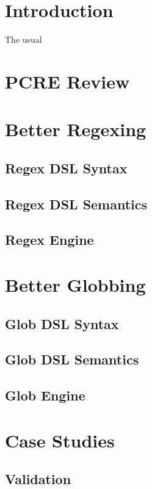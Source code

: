 \documentclass[acmsmall,review,anonymous]{acmart}
\begin{document}
\cite{bosque}

\section{Introduction}
The usual

\section{PCRE Review}

\section{Better Regexing}

\subsection{Regex DSL Syntax}

\subsection{Regex DSL Semantics}

\subsection{Regex Engine}

\section{Better Globbing}

\subsection{Glob DSL Syntax}

\subsection{Glob DSL Semantics}

\subsection{Glob Engine}

\section{Case Studies}

\subsection{Validation}
\end{document}
